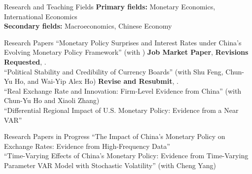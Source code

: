 \documentclass{resume_liang} %
\begin{document}
\begin{rSection}{Research and Teaching Fields}
{\bf Primary fields:} Monetary Economics, International Economics 
\vspace{0.1cm} \\ 
{\bf Secondary fields:} Macroeconomics, Chinese Economy 
\end{rSection}
\bigskip  




\begin{rSection}{Research Papers}
``Monetary Policy Surprises and Interest Rates under China's Evolving Monetary Policy Framework'' (with \href{https://sites.google.com/site/chunyuho}{\color{black}{Chun-Yu Ho}}) \textbf{Job Market Paper}, \textbf{Revisions Requested}, \textit{}.
\vspace{0.1cm} \\
``Political Stability and Credibility of Currency Boards'' (with Shu Feng, Chun-Yu Ho, and Wai-Yip Alex Ho) \textbf{Revise and Resubmit}, \textit{}.
\vspace{0.1cm} \\
``Real Exchange Rate and Innovation: Firm-Level Evidence from China'' (with Chun-Yu Ho and Xiaoli Zhang) 
\vspace{0.1cm} \\
``Differential Regional Impact of U.S. Monetary Policy: Evidence from a Near VAR''
\end{rSection}
\bigskip  




\begin{rSection}{Research Papers in Progress}
``The Impact of China's Monetary Policy on Exchange Rates: Evidence from High-Frequency Data''
\vspace{0.1cm}\\
``Time-Varying Effects of China's Monetary Policy: Evidence from Time-Varying Parameter VAR Model with Stochastic Volatility'' (with Cheng Yang)
\end{rSection}
\bigskip  
\end{document}
